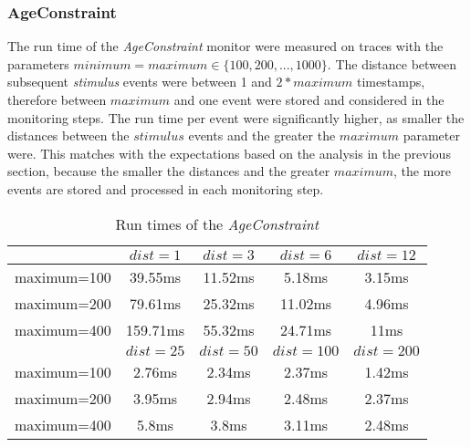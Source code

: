 \subsubsection{AgeConstraint}
The run time of the \textit{AgeConstraint} monitor were measured on traces with the parameters $minimum = maximum\in\{100,200,...,1000\}$. The distance between subsequent \textit{stimulus} events were between 1 and $2*maximum$ timestamps, therefore between $maximum$ and one event were stored and considered in the monitoring steps. The run time per event were significantly higher, as smaller the distances between the $stimulus$ events and the greater the $maximum$ parameter were. This matches with the expectations based on the analysis in the previous section, because the smaller the distances and the greater $maximum$, the more events are stored and processed in each monitoring step.
\begin{table}
		\begin{tabular}{|c|c|c|c|c|}
		\hline
		& $dist=1$ & $dist=3$ & $dist=6$ & $dist=12$  \\
		\hline
		maximum=100 & 39.55ms & 11.52ms & 5.18ms & 3.15ms\\
		\hline
		maximum=200 & 79.61ms & 25.32ms & 11.02ms & 4.96ms\\
		\hline
		maximum=400 & 159.71ms & 55.32ms & 24.71ms & 11ms\\
		\hline
		\hline
		& $dist=25$ & $dist=50$ &$dist=100$ & $dist=200$\\
		\hline
		maximum=100 & 2.76ms & 2.34ms & 2.37ms & 1.42ms\\
		\hline
		maximum=200 & 3.95ms & 2.94ms & 2.48ms & 2.37ms\\
		\hline
		maximum=400 & 5.8ms & 3.8ms & 3.11ms & 2.48ms\\
		\hline
	\end{tabular}
	\centering
	\caption{Run times of the \textit{AgeConstraint}}
	\label{tab:runtimeAgeConstraint}
\end{table}

